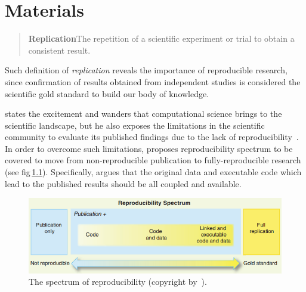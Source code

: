 \graphicspath{{4_materials/figures/}}
\chapter{Materials}\label{chap:4}

\begin{quote}
  \textbf{Replication}\quad The repetition of a scientific
  experiment or trial to obtain a consistent result.
\end{quote}

Such definition of \emph{replication} reveals the importance of reproducible research, since confirmation of results obtained from independent studies is considered the scientific gold standard to build our body of knowledge.

\citeauthor{peng2011reproducible} states the excitement and wanders that computational science brings to the scientific landscape, but he also exposes the limitations in the scientific community to evaluate its published findings due to the lack of reproducibility~\cite{peng2011reproducible}.
In order to overcome such limitations, \citeauthor{peng2011reproducible} proposes reproducibility spectrum to be covered to move from non-reproducible publication to fully-reproducible research (see \acs{fig}\,\ref{fig:reproducibility_spectrum}).
Specifically, \citeauthor{peng2011reproducible} argues that the original data and executable code which lead to the published results should be all coupled and available. 

\begin{figure}
\centering
\includegraphics[width=.7\textwidth]{reproducibility_spectrum}
\caption[The spectrum of reproducibility.]{The spectrum of reproducibility (copyright by~\cite{peng2011reproducible}).}
\label{fig:reproducibility_spectrum}
\end{figure}

